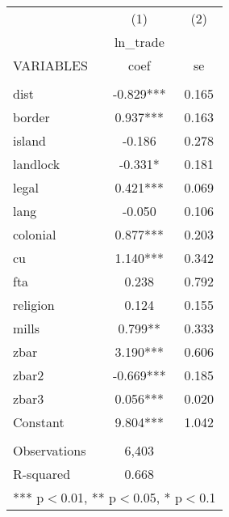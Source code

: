\documentclass[]{article}
\begin{document}
\begin{tabular}{lcc} \hline
 & (1) & (2) \\
 & ln\_trade &  \\
VARIABLES & coef & se \\ \hline
 &  &  \\
dist & -0.829*** & 0.165 \\
border & 0.937*** & 0.163 \\
island & -0.186 & 0.278 \\
landlock & -0.331* & 0.181 \\
legal & 0.421*** & 0.069 \\
lang & -0.050 & 0.106 \\
colonial & 0.877*** & 0.203 \\
cu & 1.140*** & 0.342 \\
fta & 0.238 & 0.792 \\
religion & 0.124 & 0.155 \\
mills & 0.799** & 0.333 \\
zbar & 3.190*** & 0.606 \\
zbar2 & -0.669*** & 0.185 \\
zbar3 & 0.056*** & 0.020 \\
Constant & 9.804*** & 1.042 \\
 &  &  \\
Observations & 6,403 &  \\
 R-squared & 0.668 &  \\ \hline
\multicolumn{3}{c}{ *** p$<$0.01, ** p$<$0.05, * p$<$0.1} \\
\end{tabular}
\end{document}
